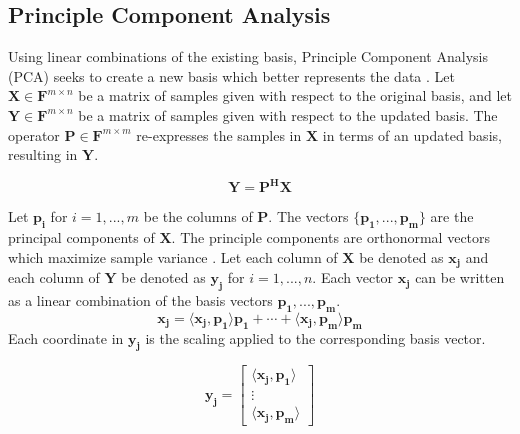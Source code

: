 \documentclass[conference]{IEEEtran}
\begin{document}
    \subsection{Principle Component Analysis} \label{pca_section}
    
    Using linear combinations of the existing basis, Principle Component Analysis (PCA) seeks to create a new basis which better represents the data \cite{shlens_2014_tutorial}. Let $\mathbf{X} \in \mathbf{F}^{m \times n}$ be a matrix of samples given with respect to the original basis, and let $\mathbf{Y} \in \mathbf{F}^{m \times n}$ be a matrix of samples given with respect to the updated basis. The operator $\mathbf{P} \in \mathbf{F}^{m \times m}$ re-expresses the samples in $\mathbf{X}$ in terms of an updated basis, resulting in $\mathbf{Y}$.
    
    \begin{equation}
    		\mathbf{Y} = \mathbf{P^{H}X}
    \end{equation}
    
    Let $\mathbf{p_i}$ for $i = 1,...,m$ be the columns of $\mathbf{P}$. The vectors $\{\mathbf{p_1},...,\mathbf{p_m}\}$ are the principal components of $\mathbf{X}$. The principle components are orthonormal vectors which maximize sample variance \cite{shlens_2014_tutorial}. Let each column of $\mathbf{X}$ be denoted as $\mathbf{x_j}$ and each column of $\mathbf{Y}$ be denoted as $\mathbf{y_j}$ for $i = 1,...,n$. Each vector $\mathbf{x_j}$ can be written as a linear combination of the basis vectors $\mathbf{p_1},...,\mathbf{p_m}$.
    \begin{equation}
        \mathbf{x_j} = \langle \mathbf{x_j}, \mathbf{p_1}\rangle \mathbf{p_1} + \cdots + \langle \mathbf{x_j}, \mathbf{p_m}\rangle \mathbf{p_m}
    \end{equation}
    Each coordinate in $\mathbf{y_j}$ is the scaling applied to the corresponding basis vector.
    	
    \begin{equation}
        \mathbf{y_j} = \begin{bmatrix}
                        \langle \mathbf{x_j}, \mathbf{p_1} \rangle\\
                        \vdots \\
                        \langle \mathbf{x_j}, \mathbf{p_m}\rangle
                        \end{bmatrix}
    \end{equation}
    	
    	
\end{document}
